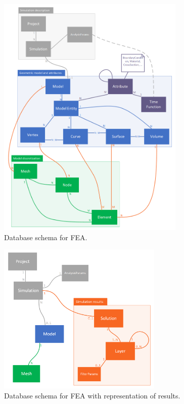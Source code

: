 \begin{figure}[H]
    \centering
    \includegraphics[width=0.8\textwidth]{figures/FEA-database-schema}
    \decoRule
    \caption{Database schema for FEA.}
    \label{fig:FEA-db-schema}
\end{figure}

\begin{figure}[H]
    \centering
    \includegraphics[width=0.7\textwidth]{figures/FEA-database-schema-with-results}
    \decoRule
    \caption{Database schema for FEA with representation of results.}
    \label{fig:FEA-db-schema-results}
\end{figure}

